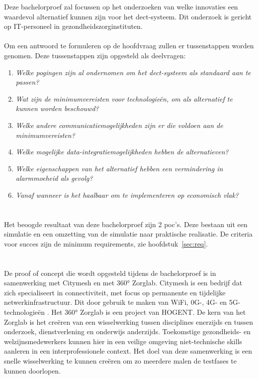 Deze bachelorproef zal focussen op het onderzoeken van welke innovaties een waardevol alternatief kunnen zijn voor het \gls{dect}-systeem. Dit onderzoek is gericht op IT-personeel in gezondheidszorginstituten.\\\\

Om een antwoord te formuleren op de hoofdvraag zullen er tussenstappen worden genomen. Deze tussenstappen zijn opgesteld als deelvragen:

\begin{enumerate}
  \item \textit{Welke pogingen zijn al ondernomen om het \gls{dect}-systeem als standaard aan te passen?}
  \item \textit{Wat zijn de minimumvereisten voor technologieën, om als alternatief te kunnen worden beschouwd?}
  \item \textit{Welke andere communicatiemogelijkheden zijn er die voldoen aan de minimumvereisten?}
  \item \textit{Welke mogelijke data-integratiemogelijkheden hebben de alternatieven?}
  \item \textit{Welke eigenschappen van het alternatief hebben een vermindering in alarmmoeheid als gevolg?}
  \item \textit{Vanaf wanneer is het haalbaar om te implementeren op economisch vlak?}
\end{enumerate}

\section{}%
\label{sec:onderzoeksdoelstelling}


Het beoogde resultaat van deze bachelorproef zijn 2 \gls{poc}'s. Deze bestaan uit een simulatie en een omzetting van de simulatie naar praktische realisatie. De criteria voor succes zijn de minimum requirements, zie hoofdstuk~\ref{sec:req}.

\section{}%
\label{sec:opzet-bachelorproef}


De proof of concept die wordt opgesteld tijdens de bachelorproef is in samenwerking met Citymesh en met 360° Zorglab. Citymesh is een bedrijf dat zich specialiseert in connectiviteit, met focus op permanente en tijdelijke netwerkinfrastructuur. Dit door gebruik te maken van WiFi, 0G-, 4G- en 5G-technologieën \autocite{Citymesh2024}. Het 360° Zorglab is een project van HOGENT. De kern van het Zorglab is het creëren van een wisselwerking tussen disciplines enerzijds en tussen onderzoek, dienstverlening en onderwijs anderzijds. Toekomstige gezondheids- en welzijnsmedewerkers kunnen hier in een veilige omgeving niet-technische skills aanleren in een interprofessionele context. \autocite{HOGENT2024} Het doel van deze samenwerking is een snelle wisselwerking te kunnen creëren om zo meerdere malen de testfases te kunnen doorlopen. 

